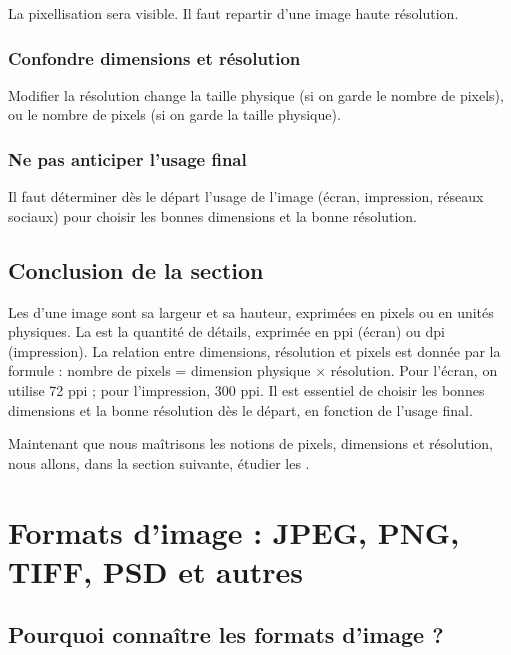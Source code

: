 La pixellisation sera visible. Il faut repartir d'une image haute résolution.

\subsubsection{Confondre dimensions et résolution}

Modifier la résolution change la taille physique (si on garde le nombre de pixels), ou le nombre de pixels (si on garde la taille physique).

\subsubsection{Ne pas anticiper l'usage final}

Il faut déterminer dès le départ l'usage de l'image (écran, impression, réseaux sociaux) pour choisir les bonnes dimensions et la bonne résolution.

\subsection*{Conclusion de la section}

Les  d'une image sont sa largeur et sa hauteur, exprimées en pixels ou en unités physiques. La  est la quantité de détails, exprimée en ppi (écran) ou dpi (impression). La relation entre dimensions, résolution et pixels est donnée par la formule : nombre de pixels = dimension physique × résolution. Pour l'écran, on utilise 72 ppi ; pour l'impression, 300 ppi. Il est essentiel de choisir les bonnes dimensions et la bonne résolution dès le départ, en fonction de l'usage final.

Maintenant que nous maîtrisons les notions de pixels, dimensions et résolution, nous allons, dans la section suivante, étudier les .

\section{Formats d'image : JPEG, PNG, TIFF, PSD et autres}

\subsection{Pourquoi connaître les formats d'image ?}

